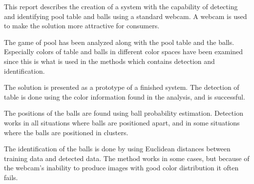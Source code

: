 This report describes the creation of a system with the capability of detecting and identifying pool table and balls using a standard webcam. A webcam is used to make the solution more attractive for consumers.

The game of pool has been analyzed along with the pool table and the balls. Especially colors of table and balls in different color spaces have been examined since this is what is used in the methods which contains detection and identification.

The solution is presented as a prototype of a finished system. The detection of table is done using the color information found in the analysis, and is successful. 

The positions of the balls are found using ball probability estimation. Detection works in all situations where balls are positioned apart, and in some situations where the balls are positioned in clusters.

The identification of the balls is done by using Euclidean distances between training data and detected data. The method works in some cases, but because of the webcam's inability to produce images with good color distribution it often fails.